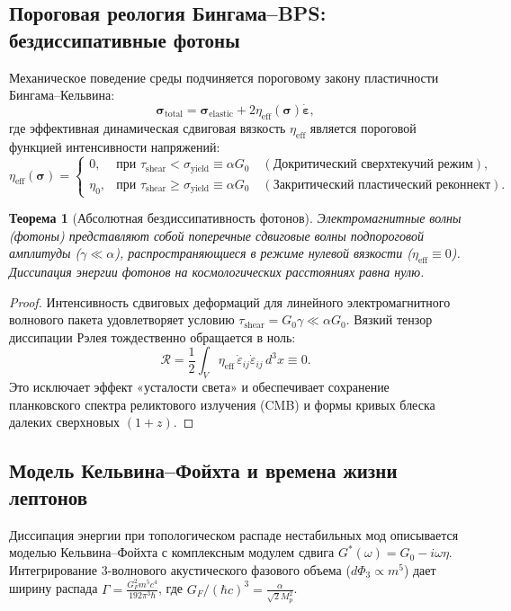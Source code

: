 \documentclass[12pt,a4paper]{article}
\newtheorem{theorem}{Теорема}
\begin{document}
	\subsection{Пороговая реология Бингама--BPS: бездиссипативные фотоны}
	Механическое поведение среды подчиняется пороговому закону пластичности Бингама--Кельвина:
	\begin{equation}
		\boldsymbol{\sigma}_{\text{total}} = \boldsymbol{\sigma}_{\text{elastic}} + 2 \eta_{\text{eff}}(\boldsymbol{\sigma}) \dot{\boldsymbol{\varepsilon}},
	\end{equation}
	где эффективная динамическая сдвиговая вязкость $\eta_{\text{eff}}$ является пороговой функцией интенсивности напряжений:
	\begin{equation}
		\eta_{\text{eff}}(\boldsymbol{\sigma}) = \begin{cases} 
			0, & \text{при } \tau_{\text{shear}} < \sigma_{\text{yield}} \equiv \alpha G_0 \quad (\text{Докритический сверхтекучий режим}), \\
			\eta_0, & \text{при } \tau_{\text{shear}} \ge \sigma_{\text{yield}} \equiv \alpha G_0 \quad (\text{Закритический пластический реконнект}).
		\end{cases}
	\end{equation}
	
	\begin{theorem}[Абсолютная бездиссипативность фотонов]
		Электромагнитные волны (фотоны) представляют собой поперечные сдвиговые волны подпороговой амплитуды ($\gamma \ll \alpha$), распространяющиеся в режиме нулевой вязкости ($\eta_{\mathrm{eff}} \equiv 0$). Диссипация энергии фотонов на космологических расстояниях равна нулю.
	\end{theorem}
	
	\begin{proof}
		Интенсивность сдвиговых деформаций для линейного электромагнитного волнового пакета удовлетворяет условию $\tau_{\text{shear}} = G_0 \gamma \ll \alpha G_0$. Вязкий тензор диссипации Рэлея тождественно обращается в ноль:
		\begin{equation}
			\mathcal{R} = \frac{1}{2} \int_V \eta_{\text{eff}} \, \dot{\varepsilon}_{ij} \dot{\varepsilon}_{ij} \, d^3x \equiv 0.
		\end{equation}
		Это исключает эффект «усталости света» и обеспечивает сохранение планковского спектра реликтового излучения (CMB) и формы кривых блеска далеких сверхновых $(1+z)$.
	\end{proof}
	
	\subsection{Модель Кельвина--Фойхта и времена жизни лептонов}
	Диссипация энергии при топологическом распаде нестабильных мод описывается моделью Кельвина--Фойхта с комплексным модулем сдвига $G^*(\omega) = G_0 - i\omega\eta$. Интегрирование 3-волнового акустического фазового объема ($d\Phi_3 \propto m^5$) дает ширину распада $\Gamma = \frac{G_F^2 m^5 c^4}{192 \pi^3 \hbar}$, где $G_F / (\hbar c)^3 = \frac{\alpha}{\sqrt{2} M_p^2}$.
	
\end{document}
